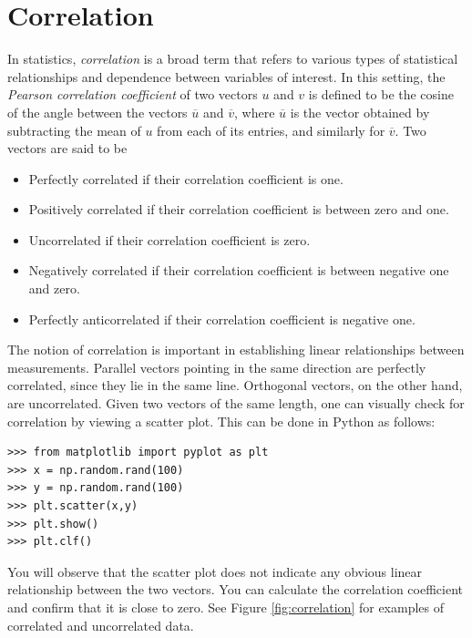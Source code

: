 
\section*{Correlation}
In statistics, \emph{correlation} is a broad term that refers to various types of statistical relationships and dependence between 
variables of interest. 
In this setting, the \emph{Pearson correlation coefficient} of two vectors $u$ and $v$ is defined to be the cosine of the angle between the 
vectors $\overline{u}$ and $\overline{v}$, where $\overline{u}$ is the vector obtained by subtracting the mean of $u$ from each of its entries,
and similarly for $\overline{v}$. 
Two vectors are said to be
\begin{itemize}
\item Perfectly correlated if their correlation coefficient is one.
\item Positively correlated if their correlation coefficient is between zero and one.
\item Uncorrelated if their correlation coefficient is zero.
\item Negatively correlated if their correlation coefficient is between negative one and zero.
\item Perfectly anticorrelated if their correlation coefficient is negative one.
\end{itemize}

The notion of correlation is important in establishing linear relationships between measurements.  
Parallel vectors pointing in the same direction are perfectly correlated, since they lie in the same line.
Orthogonal vectors, on the other hand, are uncorrelated. 
Given two vectors of the same length, one can visually check for correlation by viewing a scatter plot.
This can be done in Python as follows:
\begin{lstlisting}
>>> from matplotlib import pyplot as plt
>>> x = np.random.rand(100)
>>> y = np.random.rand(100)
>>> plt.scatter(x,y)
>>> plt.show()
>>> plt.clf()
\end{lstlisting}
You will observe that the scatter plot does not indicate any obvious linear relationship between the two
vectors. You can calculate the correlation coefficient and confirm that it is close to zero.
See Figure \ref{fig:correlation} for examples of correlated and uncorrelated data.

